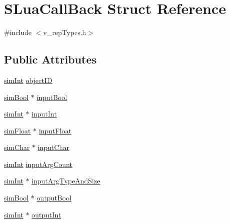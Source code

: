 \hypertarget{struct_s_lua_call_back}{\section{S\-Lua\-Call\-Back Struct Reference}
\label{struct_s_lua_call_back}
}


{\ttfamily \#include $<$v\-\_\-rep\-Types.\-h$>$}

\subsection*{Public Attributes}
\begin{DoxyCompactItemize}
\item 
\hyperlink{v__rep_types_8h_a35f702d95621fcebf5cd960176bdcfb9}{sim\-Int} \hyperlink{struct_s_lua_call_back_a1fe9f5fa55f225ebd35b50249a46bf98}{object\-I\-D}
\item 
\hyperlink{v__rep_types_8h_a28c2dc25059fcfc02e14f59e277b00e4}{sim\-Bool} $\ast$ \hyperlink{struct_s_lua_call_back_abf64b737945186918030b25ad2e5cb4c}{input\-Bool}
\item 
\hyperlink{v__rep_types_8h_a35f702d95621fcebf5cd960176bdcfb9}{sim\-Int} $\ast$ \hyperlink{struct_s_lua_call_back_ac1690a9cd01fd676958b69ff9c9431d2}{input\-Int}
\item 
\hyperlink{v__rep_types_8h_a0931040573e3d2bf15ef34c0be22beec}{sim\-Float} $\ast$ \hyperlink{struct_s_lua_call_back_a9417702f7811b73d78b389dd855ad984}{input\-Float}
\item 
\hyperlink{v__rep_types_8h_a2384478fb9f1c4a8418cd96157f87217}{sim\-Char} $\ast$ \hyperlink{struct_s_lua_call_back_afc1c4ef5be9bffa4d4ddec27bc1ba9f7}{input\-Char}
\item 
\hyperlink{v__rep_types_8h_a35f702d95621fcebf5cd960176bdcfb9}{sim\-Int} \hyperlink{struct_s_lua_call_back_a284412eb79cc48e9ffc35fe04016d134}{input\-Arg\-Count}
\item 
\hyperlink{v__rep_types_8h_a35f702d95621fcebf5cd960176bdcfb9}{sim\-Int} $\ast$ \hyperlink{struct_s_lua_call_back_a2951a105af1306454b3a8d880780586e}{input\-Arg\-Type\-And\-Size}
\item 
\hyperlink{v__rep_types_8h_a28c2dc25059fcfc02e14f59e277b00e4}{sim\-Bool} $\ast$ \hyperlink{struct_s_lua_call_back_af30852414661a213db16769ba1ea73f2}{output\-Bool}
\item 
\hyperlink{v__rep_types_8h_a35f702d95621fcebf5cd960176bdcfb9}{sim\-Int} $\ast$ \hyperlink{struct_s_lua_call_back_a62d73457aa62d0d3b3f5a1bf3f2d72dd}{output\-Int}

\end{DoxyCompactItemize}

